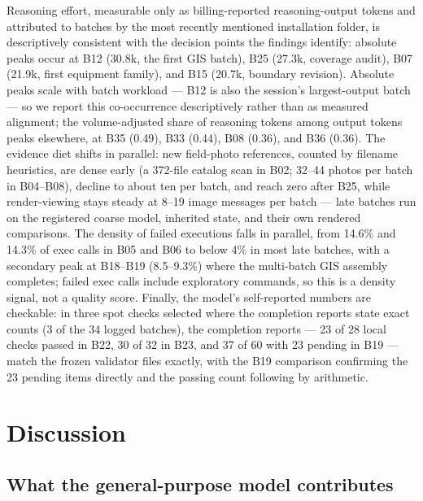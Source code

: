 \documentclass[10pt,a4paper]{article}
\begin{document}
Reasoning effort, measurable only as billing-reported reasoning-output
tokens and attributed to batches by the most recently mentioned
installation folder, is descriptively consistent with the decision
points the findings identify: absolute peaks occur at B12 (30.8k, the
first GIS batch), B25 (27.3k, coverage audit), B07 (21.9k, first
equipment family), and B15 (20.7k, boundary revision). Absolute peaks
scale with batch workload --- B12 is also the session's largest-output
batch --- so we report this co-occurrence descriptively rather than as
measured alignment; the volume-adjusted share of reasoning tokens among
output tokens peaks elsewhere, at B35 (0.49), B33 (0.44), B08 (0.36),
and B36 (0.36). The evidence diet shifts in parallel: new field-photo
references, counted by filename heuristics, are dense early (a 372-file
catalog scan in B02; 32--44 photos per batch in B04--B08), decline to
about ten per batch, and reach zero after B25, while render-viewing
stays steady at 8--19 image messages per batch --- late batches run on
the registered coarse model, inherited state, and their own rendered
comparisons. The density of failed executions falls in parallel, from
14.6\% and 14.3\% of exec calls in B05 and B06 to below 4\% in most late
batches, with a secondary peak at B18--B19 (8.5--9.3\%) where the
multi-batch GIS assembly completes; failed exec calls include
exploratory commands, so this is a density signal, not a quality score.
Finally, the model's self-reported numbers are checkable: in three spot
checks selected where the completion reports state exact counts (3 of
the 34 logged batches), the completion reports --- 23 of 28 local checks
passed in B22, 30 of 32 in B23, and 37 of 60 with 23 pending in B19 ---
match the frozen validator files exactly, with the B19 comparison
confirming the 23 pending items directly and the passing count following
by arithmetic.

\hypertarget{discussion}{%
\section{Discussion}\label{discussion}}

\hypertarget{what-the-general-purpose-model-contributes}{%
\subsection{What the general-purpose model
contributes}\label{what-the-general-purpose-model-contributes}}
\end{document}
